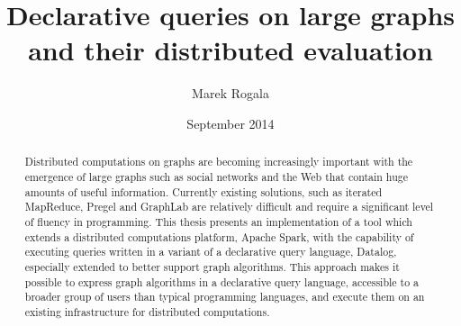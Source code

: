 \documentclass{pracamgr}
\author{Marek Rogala}
\title{Declarative queries on large graphs and their distributed evaluation}
\date{September 2014}
\theoremstyle{plain}
\theoremstyle{definition}
\theoremstyle{remark}
\begin{document}
\maketitle

\begin{abstract}
Distributed computations on graphs are becoming increasingly important with the emergence of large graphs such as social networks and the Web that contain huge amounts of useful information.
Currently existing solutions, such as iterated MapReduce, Pregel and GraphLab are relatively difficult and require a significant level of fluency in programming.
This thesis presents an implementation of a tool which extends a distributed computations platform, Apache Spark, with the capability of executing queries written in a variant of a declarative query language, Datalog, especially extended to better support graph algorithms.
This approach makes it possible to express graph algorithms in a declarative query language, accessible to a broader group of users than typical programming languages, and execute them on an existing infrastructure for distributed computations.
\end{abstract}

\tableofcontents













\appendix




\end{document}
